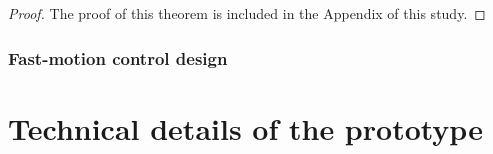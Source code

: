 \documentclass[journal,twocolumn]{IEEEtran}
\begin{document}
\begin{proof}
    The proof of this theorem is included in the Appendix of this study. 
\end{proof}

\subsubsection{Fast-motion control design}

\section{Technical details of the prototype }





\end{document}
